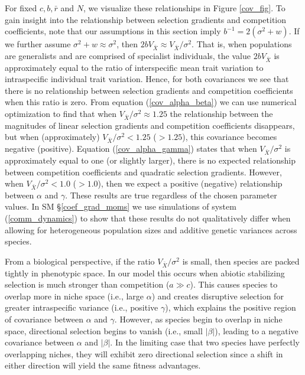 \documentclass[]{article}
\begin{document}
For fixed \(c,b,\bar r\) and \(N\), we visualize these relationships in
Figure \ref{cov_fig}. To gain insight into the relationship between
selection gradients and competition coefficients, note that our
assumptions in this section imply \(b^{-1}=2(\sigma^2+w)\). If we
further assume \(\sigma^2+w\approx\sigma^2\), then
\(2bV_{\bar X}\approx V_{\bar X}/\sigma^2\). That is, when populations
are generalists and are comprised of specialist individuals, the value
\(2bV_{\bar X}\) is approximately equal to the ratio of interspecific
mean trait variation to intraspecific individual trait variation. Hence,
for both covariances we see that there is no relationship between
selection gradients and competition coefficients when this ratio is
zero. From equation (\ref{cov_alpha_beta}) we can use numerical
optimization to find that when \(V_{\bar X}/\sigma^2\approx1.25\) the
relationship between the magnitudes of linear selection gradients and
competition coefficients disappears, but when (approximately)
\(V_{\bar X}/\sigma^2<1.25\) (\(>1.25\)), this covariance becomes
negative (positive). Equation (\ref{cov_alpha_gamma}) states that when
\(V_{\bar X}/\sigma^2\) is approximately equal to one (or slightly
larger), there is no expected relationship between competition
coefficients and quadratic selection gradients. However, when
\(V_{\bar X}/\sigma^2<1.0\) (\(>1.0\)), then we expect a positive
(negative) relationship between \(\alpha\) and \(\gamma\). These results
are true regardless of the chosen parameter values. In SM
\S\ref{coef_grad_moms} we use simulations of system
(\ref{comm_dynamics}) to show that these results do not qualitatively
differ when allowing for heterogeneous population sizes and additive
genetic variances across species.

From a biological perspective, if the ratio \(V_{\bar X}/\sigma^2\) is
small, then species are packed tightly in phenotypic space. In our model
this occurs when abiotic stabilizing selection is much stronger than
competition (\(a\gg c\)). This causes species to overlap more in niche
space (i.e., large \(\alpha\)) and creates disruptive selection for
greater intraspecific variance (i.e., positive \(\gamma\)), which
explains the positive region of covariance between \(\alpha\) and
\(\gamma\). However, as species begin to overlap in niche space,
directional selection begins to vanish (i.e., small \(|\beta|\)),
leading to a negative covariance between \(\alpha\) and \(|\beta|\). In
the limiting case that two species have perfectly overlapping niches,
they will exhibit zero directional selection since a shift in either
direction will yield the same fitness advantages.
\end{document}
